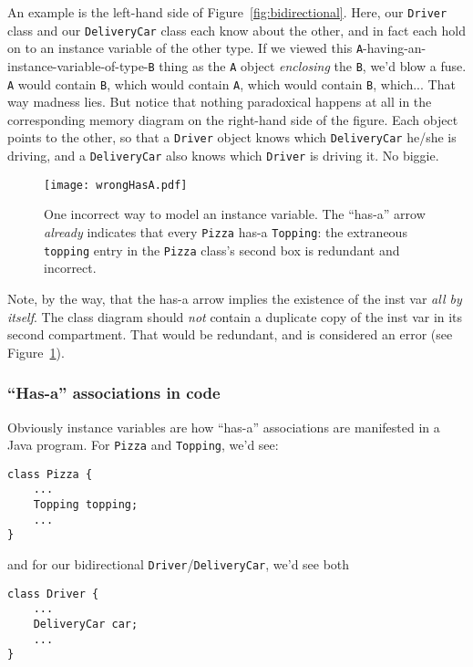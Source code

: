 An example is the left-hand side of Figure~\ref{fig:bidirectional}. Here, our
\texttt{Driver} class and our \texttt{DeliveryCar} class each know about the
other, and in fact each hold on to an instance variable of the other type. If
we viewed this \texttt{A}-having-an-instance-variable-of-type-\texttt{B} thing
as the \texttt{A} object \textit{enclosing} the \texttt{B}, we'd blow a fuse.
\texttt{A} would contain \texttt{B}, which would contain \texttt{A}, which
would contain \texttt{B}, which... That way madness lies. But notice that
nothing paradoxical happens at all in the corresponding memory diagram on the
right-hand side of the figure. Each object points to the other, so that a
\texttt{Driver} object knows which \texttt{DeliveryCar} he/she is driving, and
a \texttt{DeliveryCar} also knows which \texttt{Driver} is driving it. No
biggie.

\begin{figure}[ht]
\centering
\texttt{[image: wrongHasA.pdf]}   %
\caption{One incorrect way to model an instance variable. The ``has-a'' arrow
\textit{already} indicates that every \texttt{Pizza} has-a \texttt{Topping}: the
extraneous \texttt{topping} entry in the \texttt{Pizza} class's second box is
redundant and incorrect.}
\label{fig:wrongHasA}
\end{figure}

Note, by the way, that the has-a arrow implies the existence of the inst var
\textit{all by itself}. The class diagram should \textit{not} contain a
duplicate copy of the inst var in its second compartment. That would be
redundant, and is considered an error (see Figure~\ref{fig:wrongHasA}).

\subsubsection{``Has-a'' associations in code}

Obviously instance variables are how ``has-a'' associations are manifested in a
Java program. For \texttt{Pizza} and \texttt{Topping}, we'd see:

\begin{Verbatim}[fontsize=\scriptsize,samepage=true,frame=single]
class Pizza {
    ...
    Topping topping;
    ...
}
\end{Verbatim}

and for our bidirectional \texttt{Driver}/\texttt{DeliveryCar}, we'd see both
\begin{Verbatim}[fontsize=\scriptsize,samepage=true,frame=single]
class Driver {
    ...
    DeliveryCar car;
    ...
}
\end{Verbatim}

